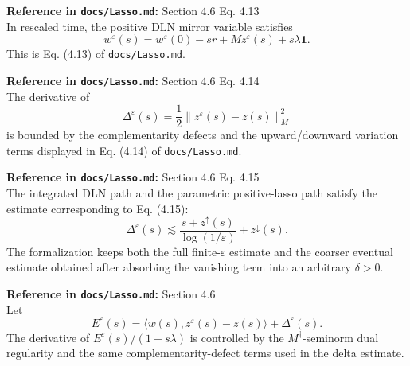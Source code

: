 \begin{lemma}\label{lem:positiveIntegratedMirrorEquation}
  \textbf{Reference in \texttt{docs/Lasso.md}:} Section 4.6 Eq. 4.13\\
In rescaled time, the positive DLN mirror variable satisfies
\[
  w^\varepsilon(s)
  =
  w^\varepsilon(0)-sr+M z^\varepsilon(s)+s\lambda\mathbf{1}.
\]
This is Eq. (4.13) of \texttt{docs/Lasso.md}.
\end{lemma}

\begin{lemma}\label{lem:positiveDeltaDifferential}
  \textbf{Reference in \texttt{docs/Lasso.md}:} Section 4.6 Eq. 4.14\\
The derivative of
\[
  \Delta^\varepsilon(s)
  =
  \frac12\|z^\varepsilon(s)-z(s)\|_M^2
\]
is bounded by the complementarity defects and the upward/downward variation
terms displayed in Eq. (4.14) of \texttt{docs/Lasso.md}.
\end{lemma}

\begin{lemma}\label{lem:positiveDeltaEstimate}
  \textbf{Reference in \texttt{docs/Lasso.md}:} Section 4.6 Eq. 4.15\\
The integrated DLN path and the parametric positive-lasso path satisfy the
estimate corresponding to Eq. (4.15):
\[
  \Delta^\varepsilon(s)
    \lesssim
    \frac{s+z^\uparrow(s)}{\log(1/\varepsilon)}
      + z^\downarrow(s).
\]
The formalization keeps both the full finite-\(\varepsilon\) estimate and the
coarser eventual estimate obtained after absorbing the vanishing term into an
arbitrary \(\delta>0\).
\end{lemma}

\begin{lemma}\label{lem:positiveEnergyDifferential}
  \textbf{Reference in \texttt{docs/Lasso.md}:} Section 4.6\\
Let
\[
  E^\varepsilon(s)
  =
  \langle w(s),z^\varepsilon(s)-z(s)\rangle
  +
  \Delta^\varepsilon(s).
\]
The derivative of \(E^\varepsilon(s)/(1+s\lambda)\) is controlled by the
\(M^\dagger\)-seminorm dual regularity and the same complementarity-defect
terms used in the delta estimate.
\end{lemma}

